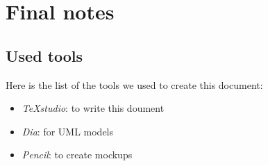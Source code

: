 \pagebreak
\section{Final notes}
\subsection{Used tools}
Here is the list of the tools we used to create this document:

\newcommand{\tool}[2]{
	\item 
		\textit{ #1}: #2	
}


\begin{itemize}
	\tool {TeXstudio}{to write this doument}
	\tool {Dia}{for UML models}
	\tool{Pencil}{to create mockups}
\end{itemize}